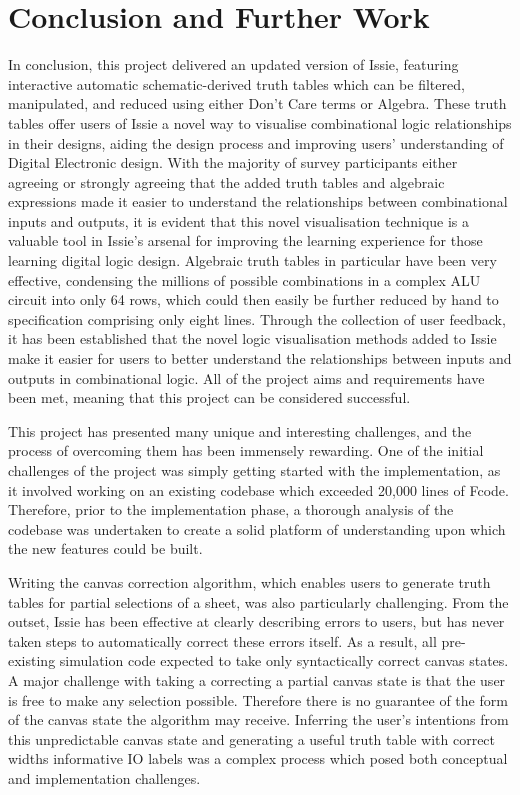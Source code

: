 \chapter{Conclusion and Further Work}
In conclusion, this project delivered an updated version of Issie, featuring interactive automatic schematic-derived truth tables which can be filtered, manipulated, and reduced using either Don't Care terms or Algebra. These truth tables offer users of Issie a novel way to visualise combinational logic relationships in their designs, aiding the design process and improving users' understanding of Digital Electronic design. With the majority of survey participants either agreeing or strongly agreeing that the added truth tables and algebraic expressions made it easier to understand the relationships between combinational inputs and outputs, it is evident that this novel visualisation technique is a valuable tool in Issie's arsenal for improving the learning experience for those learning digital logic design. Algebraic truth tables in particular have been very effective, condensing the millions of possible combinations in a complex ALU circuit into only 64 rows, which could then easily be further reduced by hand to specification comprising only eight lines. Through the collection of user feedback, it has been established that the novel logic visualisation methods added to Issie make it easier for users to better understand the relationships between inputs and outputs in combinational logic. All of the project aims and requirements have been met, meaning that this project can be considered successful.

This project has presented many unique and interesting challenges, and the process of overcoming them has been immensely rewarding. One of the initial challenges of the project was simply getting started with the implementation, as it involved working on an existing codebase which exceeded 20,000 lines of F\fsharp code. Therefore, prior to the implementation phase, a thorough analysis of the codebase was undertaken to create a solid platform of understanding upon which the new features could be built.

Writing the canvas correction algorithm, which enables users to generate truth tables for partial selections of a sheet, was also particularly challenging. From the outset, Issie has been effective at clearly describing errors to users, but has never taken steps to automatically correct these errors itself. As a result, all pre-existing simulation code expected to take only syntactically correct canvas states. A major challenge with taking a correcting a partial canvas state is that the user is free to make any selection possible. Therefore there is no guarantee of the form of the canvas state the algorithm may receive. Inferring the user's intentions from this unpredictable canvas state and generating a useful truth table with correct widths informative IO labels was a complex process which posed both conceptual and implementation challenges.

